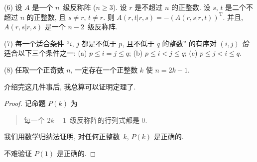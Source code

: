 (6)
设 \(A\) 是一个 \(n\)~级反称阵 (\(n \geq 3\)).
设 \(r\) 是不超过 \(n\) 的正整数.
设 \(s\), \(t\) 是二个不超过 \(n\) 的正整数,
且 \(s \neq r\), \(t \neq r\).
则
\(A(r,t|r,s) = -(A(r,s|r,t))^{\mathrm{T}}\).
并且, \(A(r,s|r,s)\)
是一个 \(n-2\)~级反称阵.

(7)
每一个适合条件
``\(i\), \(j\) 都是不低于 \(p\), 且不低于 \(q\) 的整数''
的有序对 \((i, j)\) \emph{恰}适合以下三个条件之一:
(a)
\(p \leq i = j \leq q\);
(b)
\(p \leq i < j \leq q\);
(c)
\(p \leq j < i \leq q\).

(8)
任取一个正奇数 \(n\), 一定存在一个正整数 \(k\)
使 \(n = 2k - 1\).

\vspace{2ex}

介绍完这几件事后, 我总算可以证明定理了.

\begin{proof}
    记命题 \(P(k)\) 为
    \begin{quotation}
        每一个 \(2k - 1\)~级反称阵的行列式都是 \(0\).
    \end{quotation}
    我们用数学归纳法证明,
    对任何正整数~\(k\),
    \(P(k)\) 是正确的.

    不难验证 \(P(1)\) 是正确的.


\end{proof}
